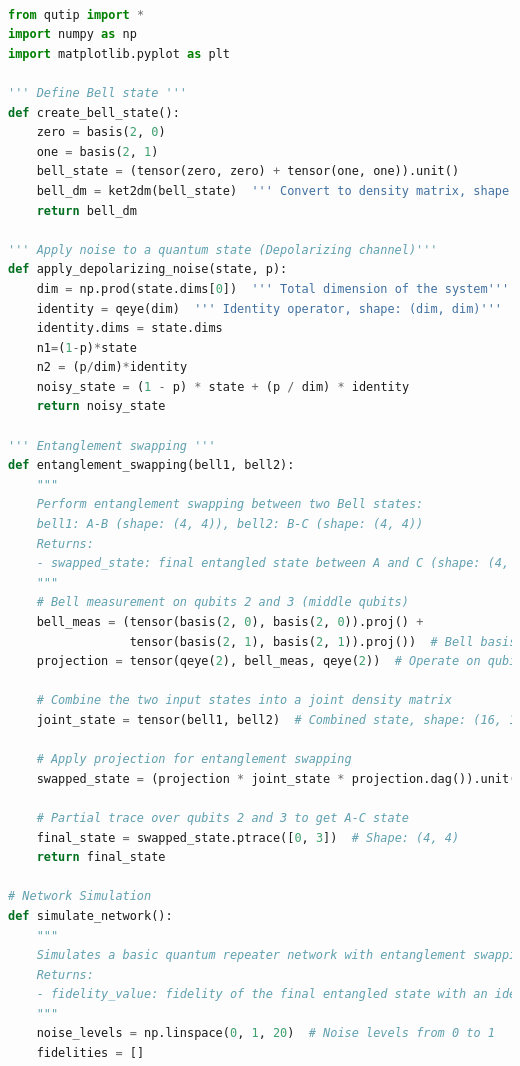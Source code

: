 \documentclass[12pt,a4paper] {report}
\begin{document}
\begin{lstlisting}[language=Python, caption=Entanglement swapping(fidelity vs polarizing noise), label=code:QKD]

from qutip import *
import numpy as np
import matplotlib.pyplot as plt

''' Define Bell state '''
def create_bell_state():
    zero = basis(2, 0)  
    one = basis(2, 1)   
    bell_state = (tensor(zero, zero) + tensor(one, one)).unit()  
    bell_dm = ket2dm(bell_state)  ''' Convert to density matrix, shape: (4, 4)'''
    return bell_dm

''' Apply noise to a quantum state (Depolarizing channel)'''
def apply_depolarizing_noise(state, p):
    dim = np.prod(state.dims[0])  ''' Total dimension of the system'''
    identity = qeye(dim)  ''' Identity operator, shape: (dim, dim)'''
    identity.dims = state.dims
    n1=(1-p)*state
    n2 = (p/dim)*identity
    noisy_state = (1 - p) * state + (p / dim) * identity
    return noisy_state

''' Entanglement swapping '''
def entanglement_swapping(bell1, bell2):
    """
    Perform entanglement swapping between two Bell states:
    bell1: A-B (shape: (4, 4)), bell2: B-C (shape: (4, 4))
    Returns:
    - swapped_state: final entangled state between A and C (shape: (4, 4))
    """
    # Bell measurement on qubits 2 and 3 (middle qubits)
    bell_meas = (tensor(basis(2, 0), basis(2, 0)).proj() + 
                 tensor(basis(2, 1), basis(2, 1)).proj())  # Bell basis, shape: (4, 4)
    projection = tensor(qeye(2), bell_meas, qeye(2))  # Operate on qubits 2 and 3, shape: (16, 16)
    
    # Combine the two input states into a joint density matrix
    joint_state = tensor(bell1, bell2)  # Combined state, shape: (16, 16)
    
    # Apply projection for entanglement swapping
    swapped_state = (projection * joint_state * projection.dag()).unit()  # Shape: (16, 16)
    
    # Partial trace over qubits 2 and 3 to get A-C state
    final_state = swapped_state.ptrace([0, 3])  # Shape: (4, 4)
    return final_state

# Network Simulation
def simulate_network():
    """
    Simulates a basic quantum repeater network with entanglement swapping.
    Returns:
    - fidelity_value: fidelity of the final entangled state with an ideal Bell state
    """
    noise_levels = np.linspace(0, 1, 20)  # Noise levels from 0 to 1
    fidelities = []



\end{lstlisting}
\end{document}
